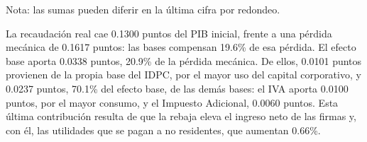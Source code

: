 \documentclass[11pt]{article}
\begin{document}
\begin{table}[H]
\centering
\caption{Recaudación y descomposición del impacto fiscal de la disminución del IDPC (porcentaje y puntos del PIB nominal inicial)}
\label{tab:idpc-descomposicion}
\small
{}
\par\smallskip
\begin{minipage}{\textwidth}
\footnotesize Nota: las sumas pueden diferir en la última cifra por redondeo.
\end{minipage}
\end{table}

La recaudación real cae 0.1300 puntos del PIB inicial, frente a una pérdida mecánica de 0.1617 puntos: las bases compensan 19.6\% de esa pérdida. El efecto base aporta 0.0338 puntos, 20.9\% de la pérdida mecánica. De ellos, 0.0101 puntos provienen de la propia base del IDPC, por el mayor uso del capital corporativo, y 0.0237 puntos, 70.1\% del efecto base, de las demás bases: el IVA aporta 0.0100 puntos, por el mayor consumo, y el Impuesto Adicional, 0.0060 puntos. Esta última contribución resulta de que la rebaja eleva el ingreso neto de las firmas y, con él, las utilidades que se pagan a no residentes, que aumentan 0.66\%.
\end{document}
